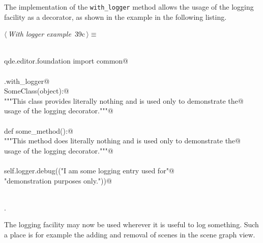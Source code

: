 \documentclass[
    a4paper,      %
    10pt,         %
    openright,    %
    notitlepage,  %
    parskip=half, %
]{scrreprt}       %
\theoremstyle{definition}                    %
\begin{document}
The implementation of the \verb+with_logger+ method allows the usage of the
logging facility as a decorator, as shown in the example in the following
listing.

\begin{flushleft} \small
\begin{minipage}{\linewidth}\label{scrap50}\raggedright\small
{} $\langle\,${\itshape With logger example}\nobreak\ {\footnotesize {39c}}$\,\rangle\equiv$
\vspace{-1exm}
\begin{list}{}{} \item
\mbox{}\lstinline@@\\
\mbox{}\lstinline@from qde.editor.foundation import common@\\
\mbox{}\lstinline@@\\
\mbox{}\lstinline@common.with_logger@\\
\mbox{}\lstinline@def SomeClass(object):@\\
\mbox{}\lstinline@    """This class provides literally nothing and is used only to demonstrate the@\\
\mbox{}\lstinline@    usage of the logging decorator."""@\\
\mbox{}\lstinline@@\\
\mbox{}\lstinline@    def some_method():@\\
\mbox{}\lstinline@        """This method does literally nothing and is used only to demonstrate the@\\
\mbox{}\lstinline@        usage of the logging decorator."""@\\
\mbox{}\lstinline@@\\
\mbox{}\lstinline@        self.logger.debug(("I am some logging entry used for"@\\
\mbox{}\lstinline@                           "demonstration purposes only."))@\\
\mbox{}\lstinline@@\\
\mbox{}\lstinline@@{\NWsep}
\end{list}
\vspace{-1.5ex}
\footnotesize
\begin{list}{}{\setlength{\itemsep}{-\parsep}\setlength{\itemindent}{-\leftmargin}}
\item {\NWtxtMacroNoRef}.

\item{}
\end{list}
\end{minipage}\vspace{4ex}
\end{flushleft}
The logging facility may now be used wherever it is useful to log something.
Such a place is for example the adding and removal of scenes in the scene graph
view.
\end{document}
